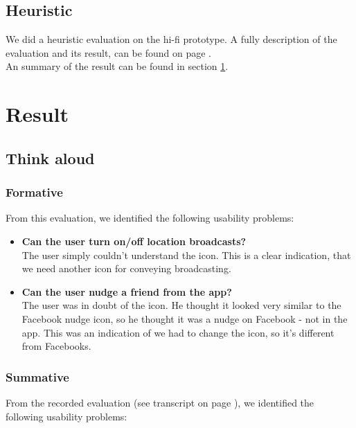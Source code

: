 \documentclass[runningheads,a4paper]{llncs}
\begin{document}
\subsection*{Heuristic}
We did a heuristic evaluation on the hi-fi prototype. A fully description of the evaluation and its result, can be found on page \pageref{heuristic}. \\
An summary of the result can be found in section \ref{result}.
\section{Result}\label{result}
\subsection*{Think aloud}

\subsubsection*{Formative}
From this evaluation, we identified the following usability problems:
\begin{itemize}
\item \textbf{Can the user turn on/off location broadcasts?}\\
	The user simply couldn't understand the icon. This is a clear indication, that we need another icon for conveying broadcasting. \\
\item \textbf{Can the user nudge a friend from the app?}\\
The user was in doubt of the icon. He thought it looked very similar to the Facebook nudge icon, so he thought it was a nudge on Facebook - not in the app. This was an indication of we had to change the icon, so it's different from Facebooks. 
\end{itemize}

\subsubsection*{Summative}

From the recorded evaluation (see transcript on page \pageref{transcript}), we identified the following usability problems:
\end{document}
